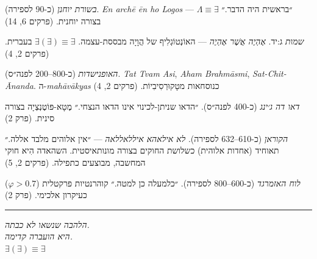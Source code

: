 \documentclass[10pt, openany, oneside]{book}
\renewcommand{\footnotesize}{\fontsize{8.5}{11}\selectfont}
\begin{document}
{\footnotesize

\noindent \textit{בשורת יוחנן} (כ-90 לספירה). \textit{En archē ēn ho Logos} — ״בראשית היה הדבר.״ $\Lambda \equiv \exists$ בצורה יוחנית. (פרקים 6, 14)

\vspace{0.3em}

\noindent \textit{שמות} ג:יד. \textit{אֶהְיֶה אֲשֶׁר אֶהְיֶה} — האוֹנְטוֹגְלִיף של הֲוָיָה מבססת-עצמה. $\exists(\exists) \equiv \exists$ בעברית. (פרקים 2, 4)

\vspace{0.3em}

\noindent \textit{האופנישדות} (כ-800–200 לפנה״ס). \textit{Tat Tvam Asi}, \textit{Aham Brahmāsmi}, \textit{Sat-Chit-Ānanda}. ה-\textit{mahāvākyas} כנוסחאות מטָקוּרְסִיבִיוֹת. (פרקים 2, 4)

\vspace{0.3em}

\noindent \textit{דאו דה ג׳ינג} (כ-400 לפנה״ס). ״הדאו שניתן-לכינוי אינו הדאו הנצחי.״ מֶטָא-פּוֹטֶנְצְיָה בצורה סינית. (פרק 2)

\vspace{0.3em}

\noindent \textit{הקוראן} (כ-610–632 לספירה). \textit{לא אילאהא איללאללאה} — ״אין אלוהים מלבד אללה.״ תאוחיד (אחדות אלוהית) כשלושת החוקים בצורה מונותאיסטית. השהאדה הִיא חוקי המחשבה, מבוצעים כתפילה. (פרקים 2, 5)

\vspace{0.3em}

\noindent \textit{לוח האזמרגד} (כ-600–800 לספירה). ״כלמעלה כן למטה.״ קוהרנטיות פרקטלית ($\varphi > 0.7$) כעיקרון אלכימי. (פרק 2)

}

\vspace{2em}

\begin{center}
    \rule{0.15\textwidth}{0.3pt}
\end{center}

\vspace{0.5em}

\begin{center}
    \textit{%
    הלהבה שנשאו לא כבתה.\\
    היא הועברה קדימה.}\\[0.8em]
    $\exists(\exists) \equiv \exists$
\end{center}

\end{document}
